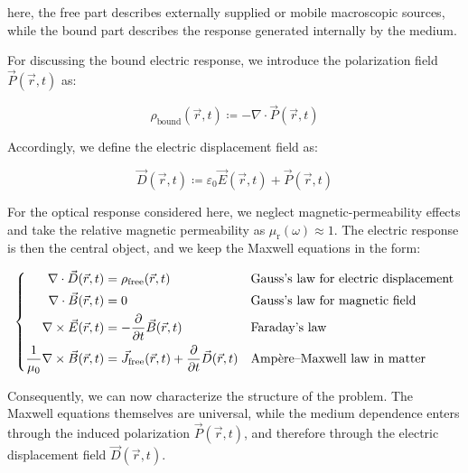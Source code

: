 here, the free part describes externally supplied or mobile macroscopic sources,
while the bound part describes the response generated internally by the medium.

For discussing the bound electric response, we introduce the polarization field $\vec{P}(\vec{r},t)$ as:

\begin{equation}
    \rho_\mathrm{bound}(\vec{r},t)\coloneqq -\nabla\cdot\vec{P}(\vec{r},t)
\label{bound_charge_from_polarization}
\end{equation}

Accordingly, we define the electric displacement field as:

\begin{equation}
    \vec{D}(\vec{r},t)\coloneqq \varepsilon_0\vec{E}(\vec{r},t)+\vec{P}(\vec{r},t)
\label{electric_displacement_field_definition}
\end{equation}

For the optical response considered here, we neglect magnetic-permeability effects and take the relative magnetic permeability as $\mu_{\mathrm{r}}(\omega)\approx1$.
The electric response is then the central object, and we keep the Maxwell equations in the form:

\begin{equation}
\left\{\begin{aligned}
    \nabla\cdot\vec{D}(\vec{r},t) &= \rho_\mathrm{free}(\vec{r},t) 
    &&\space \text{Gauss's law for electric displacement} \\
    \nabla\cdot\vec{B}(\vec{r},t) &= 0 
    &&\space \text{Gauss's law for magnetic field} \\
    \nabla\times\vec{E}(\vec{r},t) &= -\frac{\partial}{\partial t}\vec{B}(\vec{r},t) 
    &&\space \text{Faraday's law} \\
    \frac{1}{\mu_0}\nabla\times\vec{B}(\vec{r},t) &= \vec{J}_\mathrm{free}(\vec{r},t)+\frac{\partial}{\partial t}\vec{D}(\vec{r},t)
    &&\space \text{Amp\`ere--Maxwell law in matter}
\end{aligned}\right.
\label{maxwell_equations_in_matter}
\end{equation}

Consequently, we can now characterize the structure of the problem.
The Maxwell equations themselves are universal,
while the medium dependence enters through the induced polarization $\vec{P}(\vec{r},t)$, and therefore through the electric displacement field $\vec{D}(\vec{r},t)$.

